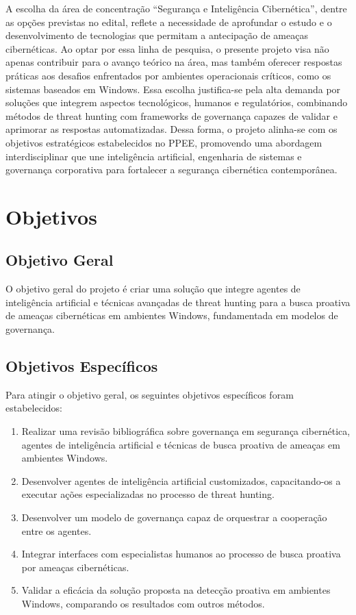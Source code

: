 \documentclass[article,12pt,a4paper]{abntex2}
\begin{document}
A escolha da área de concentração “Segurança e Inteligência Cibernética”, dentre as opções previstas no edital, reflete a necessidade de aprofundar o estudo e o desenvolvimento de tecnologias que permitam a antecipação de ameaças cibernéticas. Ao optar por essa linha de pesquisa, o presente projeto visa não apenas contribuir para o avanço teórico na área, mas também oferecer respostas práticas aos desafios enfrentados por ambientes operacionais críticos, como os sistemas baseados em Windows. Essa escolha justifica-se pela alta demanda por soluções que integrem aspectos tecnológicos, humanos e regulatórios, combinando métodos de threat hunting com frameworks de governança capazes de validar e aprimorar as respostas automatizadas. Dessa forma, o projeto alinha-se com os objetivos estratégicos estabelecidos no PPEE, promovendo uma abordagem interdisciplinar que une inteligência artificial, engenharia de sistemas e governança corporativa para fortalecer a segurança cibernética contemporânea.

\section{Objetivos}
\subsection{Objetivo Geral}
O objetivo geral do projeto é criar uma solução que integre agentes de inteligência artificial e técnicas avançadas de threat hunting para a busca proativa de ameaças cibernéticas em ambientes Windows, fundamentada em modelos de governança.

\subsection{Objetivos Específicos}
Para atingir o objetivo geral, os seguintes objetivos específicos foram estabelecidos:
\begin{enumerate}
	\item Realizar uma revisão bibliográfica sobre governança em segurança cibernética, agentes de inteligência artificial e técnicas de busca proativa de ameaças em ambientes Windows.
    \item Desenvolver agentes de inteligência artificial customizados, capacitando-os a executar ações especializadas no processo de threat hunting.
    \item Desenvolver um modelo de governança capaz de orquestrar a cooperação entre os agentes.
    \item Integrar interfaces com especialistas humanos ao processo de busca proativa por ameaças cibernéticas.
    \item Validar a eficácia da solução proposta na detecção proativa em ambientes Windows, comparando os resultados com outros métodos.
\end{enumerate}
\end{document}
